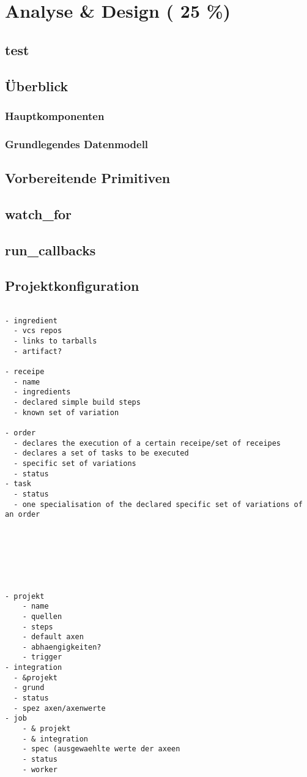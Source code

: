\chapter{Analyse \& Design ( 25 \%)}


\section{test}







\section{\"Uberblick}
\subsection{Hauptkomponenten}
\subsection{Grundlegendes Datenmodell}

\section{Vorbereitende Primitiven}
\section{watch\_for}
\section{run\_callbacks}

\section{Projektkonfiguration}

\begin{verbatim}

- ingredient
  - vcs repos
  - links to tarballs
  - artifact?

- receipe
  - name
  - ingredients
  - declared simple build steps
  - known set of variation

- order
  - declares the execution of a certain receipe/set of receipes
  - declares a set of tasks to be executed
  - specific set of variations
  - status
- task
  - status
  - one specialisation of the declared specific set of variations of an order







- projekt
    - name
    - quellen
    - steps
    - default axen
    - abhaengigkeiten?
    - trigger
- integration
  - &projekt
  - grund
  - status
  - spez axen/axenwerte
- job
    - & projekt
    - & integration
    - spec (ausgewaehlte werte der axeen
    - status
    - worker


\end{verbatim}

